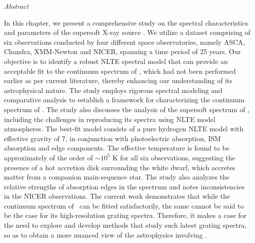 \newpage
\begin{center}
	\emph{Abstract}
\end{center}
    
    In this chapter, we present a comprehensive study on the spectral characteristics and parameters of the supersoft X-ray source \source. We utilize a dataset comprising of six observations conducted by four different space observatories, namely ASCA, Chandra, XMM-Newton and NICER, spanning a time period of 25 years. Our objective is to identify a robust NLTE spectral model that can provide an acceptable fit to the continuum spectrum of \source, which had not been performed earlier as per current literature, thereby enhancing our understanding of its astrophysical nature. The study employs rigorous spectral modeling and comparative analysis to establish a framework for characterizing the continuum spectrum of \source. The study also discusses the analysis of the supersoft spectrum of \source, including the challenges in reproducing its spectra using NLTE model atmospheres. The best-fit model consists of a pure hydrogen NLTE model with effective gravity of 7, in conjunction with photoelectric absorption, ISM absorption and edge components. The effective temperature is found to be approximately of the order of $\sim 10^5$ K for all six observations, suggesting the presence of a hot accretion disk surrounding the white dwarf, which accretes matter from a companion main-sequence star. The study also analyzes the relative strengths of absorption edges in the spectrum and notes inconsistencies in the NICER observations. {The current work demonstrates that while the continuum spectrum of \source\ can be fitted satisfactorily, the same cannot be said to be the case for its high-resolution grating spectra. Therefore, it makes a case for the need to explore and develop methods that study such latest grating spectra, so as to obtain a more nuanced view of the astrophysics involving \source.}
